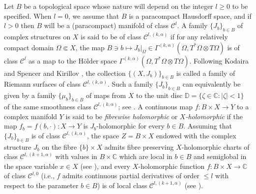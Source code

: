 \documentclass[11pt]{amsart}
\numberwithin{equation}{section}
\theoremstyle{definition}
\newcommand\Cscr{\mathscr{C}}
\newcommand\C{\mathbb{C}}
\newcommand\D{\overline{\mathbb D}}
\renewcommand\D{\mathbb D}
\begin{document}
Let $B$ be a topological space whose nature will depend 
on the integer $l\ge 0$ to be specified.
When $l=0$, we assume that $B$ is a paracompact Hausdorff space, 
and if $l>0$ then $B$ will be a (paracompact) manifold of class $\Cscr^l$. 
A family $\{J_b\}_{b\in B}$ of complex structures on $X$
is said to be of class $\Cscr^{l,(k,\alpha)}$ if 
for any relatively compact domain $\Omega\Subset X$, the map 
$B\ni b\mapsto J_b|_{\Omega}\in \Gamma^{(k,\alpha)}
(\Omega,T^*\Omega\otimes T\Omega)$ is of class $\Cscr^l$
as a map to the H\"older space 
$\Gamma^{(k,\alpha)}(\Omega,T^*\Omega\otimes T\Omega)$.
Following Kodaira and Spencer \cite{KodairaSpencer1958}
and Kirillov \cite{Kirillov1976}, the collection $\{(X,J_b)\}_{b\in B}$
is called a family of Riemann surfaces of class 
$\Cscr^{l,(k,\alpha)}$. Such a family $\{J_b\}_{b\in B}$ can equivalently 
be given by a family $\{\mu_b\}_{b\in B}$ of maps from 
$X$ to the unit disc $\D=\{\zeta\in\C:|\zeta|<1\}$
of the same smoothness class $\Cscr^{l,(k,\alpha)}$;
see \cite[Sect.\ 2]{Forstneric2024Runge}. 
%
A continuous map $f:B\times X\to Y$ to a complex manifold $Y$ 
is said to be {\em fibrewise holomorphic} or {\em $X$-holomorphic} 
if the map $f_b=f(b,\cdotp):X\to Y$ is $J_b$-holomorphic
for every $b\in B$. Assuming that $\{J_b\}_{b\in B}$ is of class
$\Cscr^{l,(k,\alpha)}$, the space $Z=B\times X$ 
endowed with the complex structure
$J_b$ on the fibre $\{b\}\times X$ admits fibre preserving 
$X$-holomorphic charts of class $\Cscr^{l,(k+1,\alpha)}$ 
with values in $B\times \C$ which are local in $b\in B$
and semiglobal in the space variable $x\in X$
(see \cite[Theorem 4.1]{Forstneric2024Runge}), and 
every $X$-holomorphic function $f:B\times X\to\C$ of class 
$\Cscr^{l,0}$ (i.e., $f$ admits continuous partial derivatives 
of order $\le l$ with respect to the parameter $b\in B$) 
is of local class $\Cscr^{l,(k+1,\alpha)}$
(see \cite[Lemma 5.6]{Forstneric2024Runge}). 
\end{document}

